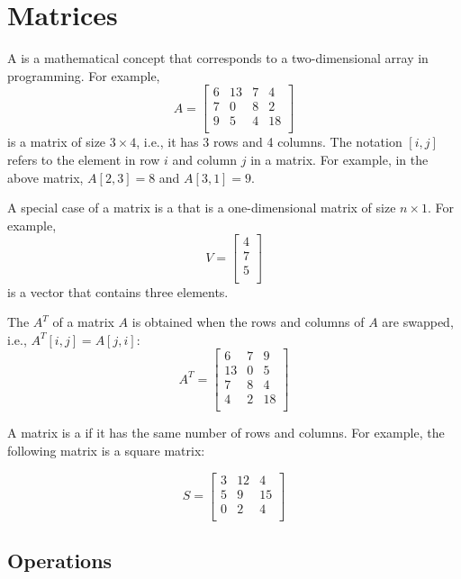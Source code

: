 \chapter{Matrices}


A  is a mathematical concept
that corresponds to a two-dimensional array
in programming. For example,
\[
A = 
 \begin{bmatrix}
  6 & 13 & 7 & 4 \\
  7 & 0 & 8 & 2 \\
  9 & 5 & 4 & 18 \\
 \end{bmatrix}
\]
is a matrix of size $3 \times 4$, i.e.,
it has 3 rows and 4 columns.
The notation $[i,j]$ refers to
the element in row $i$ and column $j$
in a matrix.
For example, in the above matrix,
$A[2,3]=8$ and $A[3,1]=9$.


A special case of a matrix is a 
that is a one-dimensional matrix of size $n \times 1$.
For example,
\[
V =
\begin{bmatrix}
4 \\
7 \\
5 \\
\end{bmatrix}
\]
is a vector that contains three elements.


The  $A^T$ of a matrix $A$
is obtained when the rows and columns of $A$
are swapped, i.e., $A^T[i,j]=A[j,i]$:
\[
A^T = 
 \begin{bmatrix}
  6 & 7 & 9 \\
  13 & 0 & 5 \\
  7 & 8 & 4 \\
  4 & 2 & 18 \\
 \end{bmatrix}
\]


A matrix is a  if it
has the same number of rows and columns.
For example, the following matrix is a
square matrix:

\[
S = 
 \begin{bmatrix}
  3 & 12 & 4  \\
  5 & 9 & 15  \\
  0 & 2 & 4 \\
 \end{bmatrix}
\]

\section{Operations}

